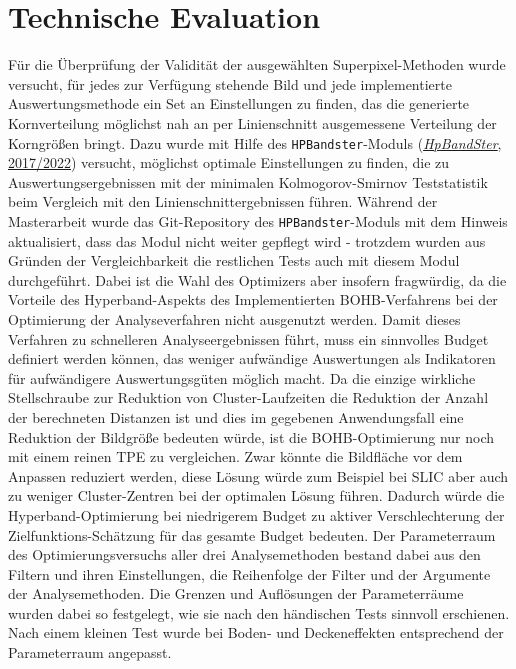 \documentclass[
  12pt,
  openany]{book}
\begin{document}
\hypertarget{technische-evaluation}{%
\section{Technische Evaluation}\label{technische-evaluation}}

Für die Überprüfung der Validität der ausgewählten Superpixel-Methoden wurde versucht, für jedes zur Verfügung stehende Bild und jede implementierte Auswertungsmethode ein Set an Einstellungen zu finden, das die generierte Kornverteilung möglichst nah an per Linienschnitt ausgemessene Verteilung der Korngrößen bringt.
Dazu wurde mit Hilfe des \texttt{HPBandster}-Moduls (\protect\hyperlink{ref-HpBandSter2022}{\emph{{HpBandSter}}, 2017/2022}) versucht, möglichst optimale Einstellungen zu finden, die zu Auswertungsergebnissen mit der minimalen Kolmogorov-Smirnov Teststatistik beim Vergleich mit den Linienschnittergebnissen führen. Während der Masterarbeit wurde das Git-Repository des \texttt{HPBandster}-Moduls mit dem Hinweis aktualisiert, dass das Modul nicht weiter gepflegt wird - trotzdem wurden aus Gründen der Vergleichbarkeit die restlichen Tests auch mit diesem Modul durchgeführt.
Dabei ist die Wahl des Optimizers aber insofern fragwürdig, da die Vorteile des Hyperband-Aspekts des Implementierten BOHB-Verfahrens bei der Optimierung der Analyseverfahren nicht ausgenutzt werden. Damit dieses Verfahren zu schnelleren Analyseergebnissen führt, muss ein sinnvolles Budget definiert werden können, das weniger aufwändige Auswertungen als Indikatoren für aufwändigere Auswertungsgüten möglich macht. Da die einzige wirkliche Stellschraube zur Reduktion von Cluster-Laufzeiten die Reduktion der Anzahl der berechneten Distanzen ist und dies im gegebenen Anwendungsfall eine Reduktion der Bildgröße bedeuten würde, ist die BOHB-Optimierung nur noch mit einem reinen TPE zu vergleichen. Zwar könnte die Bildfläche vor dem Anpassen reduziert werden, diese Lösung würde zum Beispiel bei SLIC aber auch zu weniger Cluster-Zentren bei der optimalen Lösung führen. Dadurch würde die Hyperband-Optimierung bei niedrigerem Budget zu aktiver Verschlechterung der Zielfunktions-Schätzung für das gesamte Budget bedeuten.
Der Parameterraum des Optimierungsversuchs aller drei Analysemethoden bestand dabei aus den Filtern und ihren Einstellungen, die Reihenfolge der Filter und der Argumente der Analysemethoden. Die Grenzen und Auflösungen der Parameterräume wurden dabei so festgelegt, wie sie nach den händischen Tests sinnvoll erschienen. Nach einem kleinen Test wurde bei Boden- und Deckeneffekten entsprechend der Parameterraum angepasst.
\end{document}
